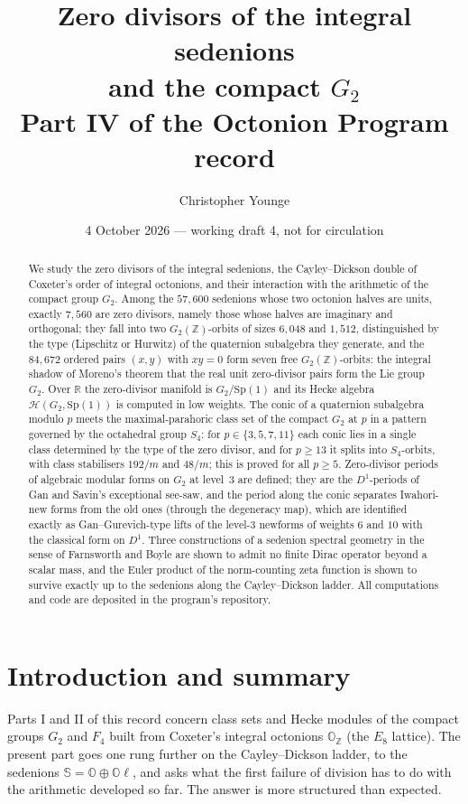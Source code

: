 \documentclass[11pt]{amsart}
\title[Zero divisors of the integral sedenions]{Zero divisors of the integral sedenions\\ and the compact $G_2$\\[4pt] {\normalsize Part IV of the Octonion Program record}}
\author{Christopher Younge}
\date{4 October 2026 --- working draft 4, not for circulation}
\theoremstyle{definition}
\renewcommand{\O}{\mathbb{O}}\newcommand{\Sd}{\mathbb{S}}\newcommand{\Hq}{\mathbb{H}}\newcommand{\Z}{\mathbb{Z}}\newcommand{\Q}{\mathbb{Q}}\newcommand{\R}{\mathbb{R}}\newcommand{\C}{\mathbb{C}}\newcommand{\F}{\mathbb{F}}
\begin{document}
\begin{abstract}
We study the zero divisors of the integral sedenions, the Cayley--Dickson double of Coxeter's order of integral octonions, and their interaction with the arithmetic of the compact group $G_2$. Among the $57{,}600$ sedenions whose two octonion halves are units, exactly $7{,}560$ are zero divisors, namely those whose halves are imaginary and orthogonal; they fall into two $G_2(\Z)$-orbits of sizes $6{,}048$ and $1{,}512$, distinguished by the type (Lipschitz or Hurwitz) of the quaternion subalgebra they generate, and the $84{,}672$ ordered pairs $(x,y)$ with $xy=0$ form seven free $G_2(\Z)$-orbits: the integral shadow of Moreno's theorem that the real unit zero-divisor pairs form the Lie group $G_2$. Over $\R$ the zero-divisor manifold is $G_2/\mathrm{Sp}(1)$ and its Hecke algebra $\mathcal H(G_2,\mathrm{Sp}(1))$ is computed in low weights. The conic of a quaternion subalgebra modulo $p$ meets the maximal-parahoric class set of the compact $G_2$ at $p$ in a pattern governed by the octahedral group $S_4$: for $p\in\{3,5,7,11\}$ each conic lies in a single class determined by the type of the zero divisor, and for $p\ge 13$ it splits into $S_4$-orbits, with class stabilisers $192/m$ and $48/m$; this is proved for all $p\ge 5$. Zero-divisor periods of algebraic modular forms on $G_2$ at level~3 are defined; they are the $D^1$-periods of Gan and Savin's exceptional see-saw, and the period along the conic separates Iwahori-new forms from the old ones (through the degeneracy map), which are identified exactly as Gan--Gurevich-type lifts of the level-$3$ newforms of weights $6$ and $10$ with the classical form on $D^1$. Three constructions of a sedenion spectral geometry in the sense of Farnsworth and Boyle are shown to admit no finite Dirac operator beyond a scalar mass, and the Euler product of the norm-counting zeta function is shown to survive exactly up to the sedenions along the Cayley--Dickson ladder. All computations and code are deposited in the program's repository.
\end{abstract}
\maketitle
\tableofcontents

\section{Introduction and summary}
Parts I and II of this record \cite{PartI,PartII} concern class sets and Hecke modules of the compact groups $G_2$ and $F_4$ built from Coxeter's integral octonions $\O_\Z$ (the $E_8$ lattice). The present part goes one rung further on the Cayley--Dickson ladder, to the sedenions $\Sd=\O\oplus\O\ell$, and asks what the first failure of division has to do with the arithmetic developed so far. The answer is more structured than expected.
\end{document}
